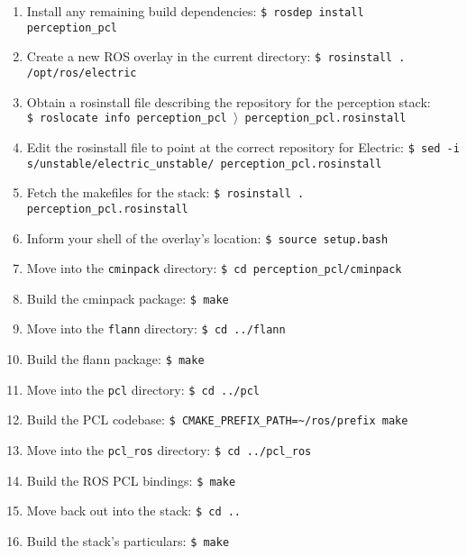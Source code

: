 \documentclass[12pt]{report}
\begin{document}
\begin{enumerate}
\item{Install any remaining build dependencies: \texttt{\$\ rosdep install perception\_pcl}}
\item{Create a new ROS overlay in the current directory: \texttt{\$\ rosinstall . /opt/ros/electric}}
\item{Obtain a rosinstall file describing the repository for the perception stack: \texttt{\$\ roslocate info perception\_pcl $\rangle$ perception\_pcl.rosinstall}}
\item{Edit the rosinstall file to point at the correct repository for Electric: \texttt{\$\ sed -i s/unstable/electric\_unstable/ perception\_pcl.rosinstall }}
\item{Fetch the makefiles for the stack: \texttt{\$\ rosinstall . perception\_pcl.rosinstall}}
\item{Inform your shell of the overlay's location: \texttt{\$\ source setup.bash}}
\item{Move into the \texttt{cminpack} directory: \texttt{\$\ cd perception\_pcl/cminpack}}
\item{Build the cminpack package: \texttt{\$\ make}}
\item{Move into the \texttt{flann} directory: \texttt{\$\ cd ../flann}}
\item{Build the flann package: \texttt{\$\ make}}
\item{Move into the \texttt{pcl} directory: \texttt{\$\ cd ../pcl}}
\item{Build the PCL codebase: \texttt{\$\ CMAKE\_PREFIX\_PATH=\~{}/ros/prefix make}}
\item{Move into the \texttt{pcl\_ros} directory: \texttt{\$\ cd ../pcl\_ros}}
\item{Build the ROS PCL bindings: \texttt{\$\ make}}
\item{Move back out into the stack: \texttt{\$\ cd ..}}
\item{Build the stack's particulars: \texttt{\$\ make}}
\end{enumerate}
\end{document}
